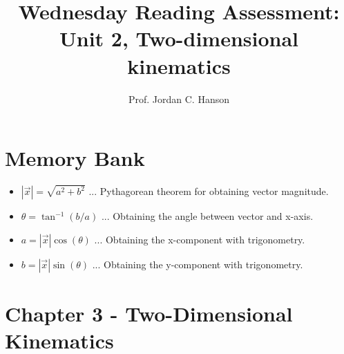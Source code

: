 \documentclass{article}
\begin{document}
\title{Wednesday Reading Assessment: Unit 2, Two-dimensional kinematics}
\author{Prof. Jordan C. Hanson}

\maketitle

\section{Memory Bank}

\begin{itemize}
\item $|\vec{x}| = \sqrt{a^2+b^2}$ ... Pythagorean theorem for obtaining vector magnitude.
\item $\theta = \tan^{-1}(b/a)$ ... Obtaining the angle between vector and x-axis.
\item $a = |\vec{x}|\cos(\theta)$ ... Obtaining the x-component with trigonometry.
\item $b = |\vec{x}|\sin(\theta)$ ... Obtaining the y-component with trigonometry.
\end{itemize}

\section{Chapter 3 - Two-Dimensional Kinematics}
\end{document}
